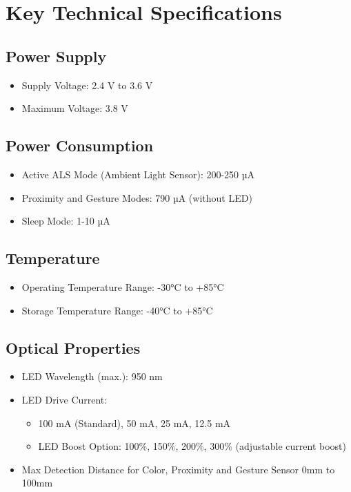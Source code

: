 \section{Key Technical Specifications}
\label{chap:Specification}

\subsection*{Power Supply}
\begin{itemize}
	\item Supply Voltage: 2.4 V to 3.6 V
	\item Maximum Voltage: 3.8 V
\end{itemize}

\subsection*{Power Consumption}
\begin{itemize}
	\item Active ALS Mode (Ambient Light Sensor): 200-250 µA
	\item Proximity and Gesture Modes: 790 µA (without LED)
	\item Sleep Mode: 1-10 µA
\end{itemize}

\subsection*{Temperature}
\begin{itemize}
	\item Operating Temperature Range: -30°C to +85°C
	\item Storage Temperature Range: -40°C to +85°C
\end{itemize}

\subsection*{Optical Properties}
\begin{itemize}
	\item LED Wavelength (max.): 950 nm
	\item LED Drive Current:
	\begin{itemize}
		\item 100 mA (Standard), 50 mA, 25 mA, 12.5 mA
		\item LED Boost Option: 100\%, 150\%, 200\%, 300\% (adjustable current boost)
	\end{itemize}
	\item Max Detection Distance for Color, Proximity and Gesture Sensor 0mm to 100mm
\end{itemize}


